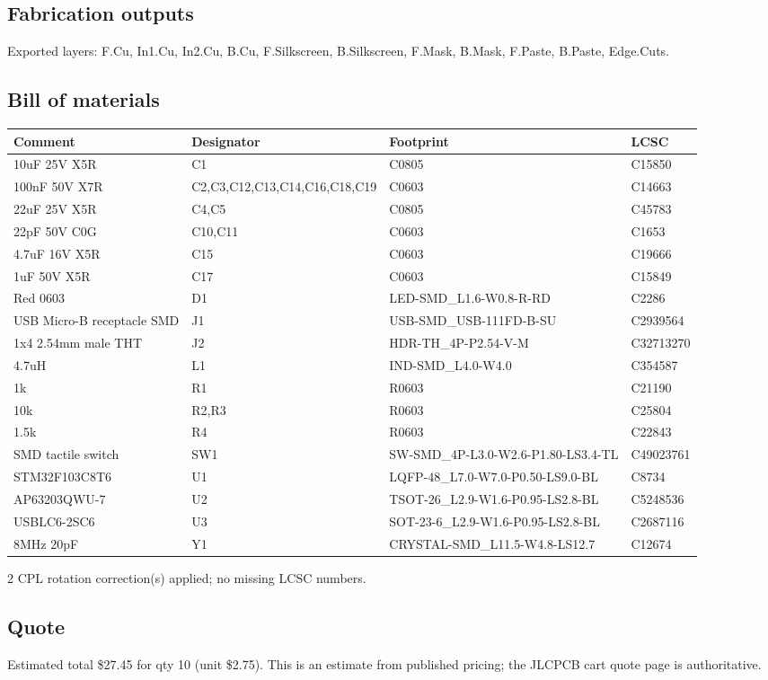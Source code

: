 \documentclass[11pt,a4paper]{article}
\begin{document}
\subsection*{Fabrication outputs}
Exported layers: F.Cu, In1.Cu, In2.Cu, B.Cu, F.Silkscreen, B.Silkscreen, F.Mask, B.Mask, F.Paste, B.Paste, Edge.Cuts.
\subsection*{Bill of materials}
{\small
\begin{longtable}{p{4.4cm}p{2.8cm}p{4.6cm}l}
\toprule
\textbf{Comment} & \textbf{Designator} & \textbf{Footprint} & \textbf{LCSC} \\
\midrule
\endhead
10uF 25V X5R & C1 & C0805 & C15850 \\
100nF 50V X7R & C2,C3,C12,C13,C14,C16,C18,C19 & C0603 & C14663 \\
22uF 25V X5R & C4,C5 & C0805 & C45783 \\
22pF 50V C0G & C10,C11 & C0603 & C1653 \\
4.7uF 16V X5R & C15 & C0603 & C19666 \\
1uF 50V X5R & C17 & C0603 & C15849 \\
Red 0603 & D1 & LED-SMD\_L1.6-W0.8-R-RD & C2286 \\
USB Micro-B receptacle SMD & J1 & USB-SMD\_USB-111FD-B-SU & C2939564 \\
1x4 2.54mm male THT & J2 & HDR-TH\_4P-P2.54-V-M & C32713270 \\
4.7uH & L1 & IND-SMD\_L4.0-W4.0 & C354587 \\
1k & R1 & R0603 & C21190 \\
10k & R2,R3 & R0603 & C25804 \\
1.5k & R4 & R0603 & C22843 \\
SMD tactile switch & SW1 & SW-SMD\_4P-L3.0-W2.6-P1.80-LS3.4-TL & C49023761 \\
STM32F103C8T6 & U1 & LQFP-48\_L7.0-W7.0-P0.50-LS9.0-BL & C8734 \\
AP63203QWU-7 & U2 & TSOT-26\_L2.9-W1.6-P0.95-LS2.8-BL & C5248536 \\
USBLC6-2SC6 & U3 & SOT-23-6\_L2.9-W1.6-P0.95-LS2.8-BL & C2687116 \\
8MHz 20pF & Y1 & CRYSTAL-SMD\_L11.5-W4.8-LS12.7 & C12674 \\
\bottomrule
\end{longtable}
}
2 CPL rotation correction(s) applied; no missing LCSC numbers.
\subsection*{Quote}
Estimated total \$27.45 for qty 10 (unit \$2.75). This is an estimate from published pricing; the JLCPCB cart quote page is authoritative.
\end{document}
